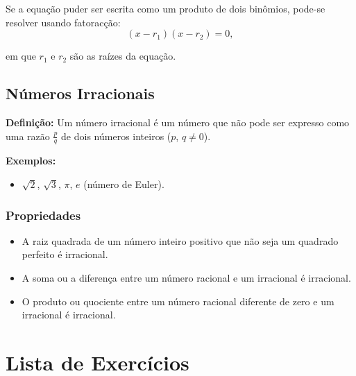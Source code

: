 \documentclass[12pt,a4paper]{article}
\begin{document}
Se a equa\c{c}\~ao puder ser escrita como um produto de dois bin\^omios, pode-se resolver usando fatorac\c{c}\~ao:
\begin{equation}
(x - r_1)(x - r_2) = 0,
\end{equation}

em que $r_1$ e $r_2$ s\~ao as ra\'izes da equa\c{c}\~ao.

\subsection*{N\'umeros Irracionais}

\textbf{Defini\c{c}\~ao:} Um n\'umero irracional \'e um n\'umero que n\~ao pode ser expresso como uma raz\~ao $\frac{p}{q}$ de dois n\'umeros inteiros ($p$, $q \neq 0$).

\textbf{Exemplos:}
\begin{itemize}
    \item $\sqrt{2}$, $\sqrt{3}$, $\pi$, $e$ (n\'umero de Euler).
\end{itemize}

\subsubsection*{Propriedades}
\begin{itemize}
    \item A raiz quadrada de um n\'umero inteiro positivo que n\~ao seja um quadrado perfeito \'e irracional.
    \item A soma ou a diferen\c{c}a entre um n\'umero racional e um irracional \'e irracional.
    \item O produto ou quociente entre um n\'umero racional diferente de zero e um irracional \'e irracional.
\end{itemize}

\section*{Lista de Exerc\'icios}
\end{document}
